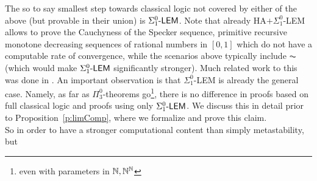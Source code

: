 The so to say smallest step towards classical logic not covered by either of the 
above (but provable in their union) is $\Sigma^0_1\textsf{\upshape -LEM}$.
Note that already HA$+\Sigma^0_1$-LEM 
allows to prove the Cauchyness of the Specker sequence, primitive recursive 
monotone decreasing sequences of rational numbers in $[0,1]$ which do not 
have a computable rate of convergence, while the scenarios above
typically include $\AC$ (which would make $\Sigma^0_1\textsf{\upshape -LEM}$ significantly stronger).
Much related work to this was done in 
\cite{Toftdal, Akama, Hayashi/Nakata, Coquand,Berardi/Coquand/Hayashi, Aschieri/Berardi,Aschieri1,Aschieri2}.
An important observation is that $\Sigma^0_1$-LEM is already the general case. 
Namely, as far as $\Pi^0_3$-theorems go\footnote{even
with parameters in $\mathbb{N},\mathbb{N}^{\mathbb{N}}$}, 
there is no difference in proofs based 
on full classical logic and proofs using only $\Sigma^0_1\textsf{\upshape -LEM}$. 
We discuss this in detail prior to Proposition~\ref{p:limComp}, where 
we formalize and prove this claim.\\
So in order to have a stronger computational content than simply metastability, but
